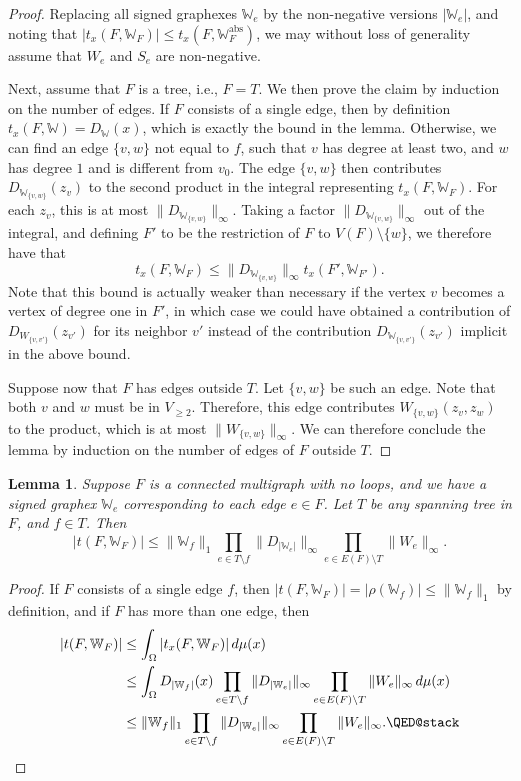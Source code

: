 \documentclass{amsart}
\numberwithin{equation}{section}
\numberwithin{figure}{section}
\newtheorem{lemma}[theorem]{Lemma}
\theoremstyle{definition}
\theoremstyle{remark}
\newcommand{\cW}{\mathbb{W}}
\begin{document}
\begin{proof}
Replacing all signed graphexes $\cW_e$ by the non-negative versions
$|\cW_e|$, and noting that $|t_x(F,\cW_F)| \le t_x(F,\cW_F^{\text{abs}})$, we
may without loss of generality assume that $W_e$ and $S_e$ are non-negative.

Next, assume that $F$ is a tree, i.e., $F=T$. We then prove the claim by
induction on the number of edges. If $F$ consists of a single edge, then by
definition $t_x(F,\cW)=D_{\cW}(x)$, which is exactly the bound in the lemma.
Otherwise, we can find an edge $\{v,w\}$ not equal to $f$, such that $v$ has
degree at least two, and $w$ has degree $1$ and is different from $v_0$. The
edge $\{v,w\}$ then contributes $D_{\cW_{\{v,w\}}}(z_v)$ to the second
product in the integral representing $t_x(F,\cW_F)$. For each $z_v$, this is
at most $\|D_{\cW_{\{v,w\}}}\|_\infty$. Taking a factor
$\|D_{\cW_{\{v,w\}}}\|_\infty$ out of the integral, and defining $F'$ to be
the restriction of $F$ to $V(F)\setminus\{w\}$, we therefore have that
\[t_x(F,\cW_F) \le \|D_{\cW_{\{v,w\}}}\|_\infty t_x(F',\cW_{F'})
.\] Note that this bound is actually weaker than necessary if the vertex $v$
becomes a vertex of degree one in $F'$, in which case we could have obtained
a contribution of $D_{W_{\{v,v'\}}}(z_{v'})$ for its neighbor $v'$ instead of
the contribution $D_{\cW_{\{v,v'\}}}(z_{v'})$ implicit in the above bound.

Suppose now that $F$ has edges outside $T$. Let $\{v,w\}$ be such an edge.
Note that both $v$ and $w$ must be in $V_{\ge 2}$. Therefore, this edge
contributes $W_{\{v,w\}}(z_v,z_w)$ to the product, which is at most
$\|W_{\{v,w\}}\|_\infty$. We can therefore conclude the lemma by induction on
the number of edges of $F$ outside $T$.
\end{proof}

\begin{lemma}\label{lem:tmultigraph}
Suppose $F$ is a connected multigraph with no loops, and we have a signed
graphex $\cW_e$ corresponding to each edge $e \in F$. Let $T$ be any spanning
tree in $F$, and $f \in T$. Then
\[
|t(F,\cW_{F})| \le \|\cW_f\|_1 \prod_{e \in T \setminus f} \|D_{|\cW_e|}\|_\infty \prod_{e \in E(F) \setminus T} \|W_e\|_\infty.
\]
\end{lemma}

\begin{proof}
If $F$ consists of a single edge $f$, then $|t(F,\cW_F)|=|\rho(\cW_f)|\leq
\|\cW_f\|_1$ by definition, and if $F$ has more than one edge, then
\begin{align*}
|t(F,\cW_F)|&\leq
\int_\Omega| t_x(F,\cW_{F})| \,d\mu(x)\\
 &\le \int_\Omega D_{|\cW_f|}(x) \prod_{e \in T \setminus f} \|D_{|\cW_e|}\|_\infty \prod_{e \in E(F) \setminus T} \|W_e\|_\infty \,d\mu(x)\\
&\leq
\|\cW_f\|_1 \prod_{e \in T \setminus f} \|D_{|\cW_e|}\|_\infty \prod_{e \in E(F) \setminus T} \|W_e\|_\infty. \qedhere
\end{align*}
\end{proof}
\end{document}
